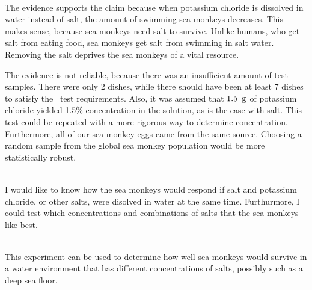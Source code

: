\documentclass[12pt]{article}
\begin{document}
\\
The evidence supports the claim because when potassium chloride is dissolved in water instead of salt, the amount of swimming sea monkeys decreases. This makes sense, because sea monkeys need salt to survive. Unlike humans, who get salt from eating food, sea monkeys get salt from swimming in salt water. Removing the salt deprives the sea monkeys of a vital resource.\double

The evidence is not reliable, because there was an insufficient amount of test samples. There were only 2 dishes, while there should have been at least 7 dishes to satisfy the \chisq\ test requirements. Also, it was assumed that $1.5\operatorname{\ g}$ of potassium chloride yielded 1.5\% concentration in the solution, as is the case with salt. This test could be repeated with a more rigorous way to determine concentration. Furthermore, all of our sea monkey eggs came from the same source. Choosing a random sample from the global sea monkey population would be more statistically robust.\double

\\
I would like to know how the sea monkeys would respond if salt and potassium chloride, or other salts, were disolved in water at the same time. Furthurmore, I could test which concentrations and combinations of salts that the sea monkeys like best.\double

\\
This experiment can be used to determine how well sea monkeys would survive in a water environment that has different concentrations of salts, possibly such as a deep sea floor.
\end{document}
